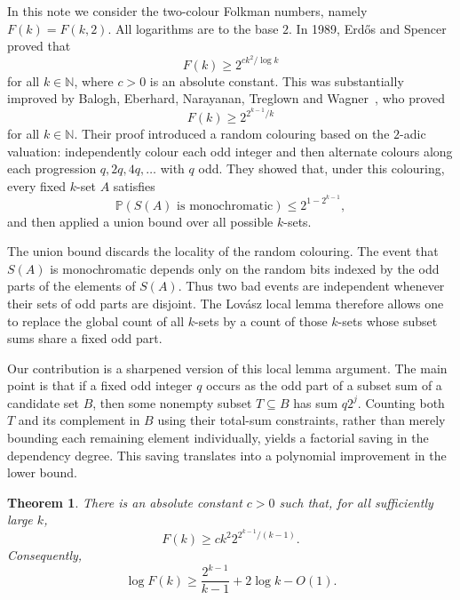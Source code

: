 \documentclass[12pt,a4paper,english,reqno]{amsart}
\theoremstyle{plain}
\newtheorem{theorem}{Theorem}[section]
\theoremstyle{remark}
\newcommand{\N}{\mathbb{N}}
\begin{document}
In this note we consider the two-colour Folkman numbers, namely $F(k)=F(k,2)$. All logarithms are to the base $2$. In 1989, Erd\H{o}s and Spencer~\cite{erdosspencer} proved that
\begin{equation}\label{es}
F(k) \ge 2^{c k^2/\log k}
\end{equation}
for all $k \in \N$, where $c>0$ is an absolute constant. This was substantially improved by Balogh, Eberhard, Narayanan, Treglown and Wagner~\cite{BENTW}, who proved
\begin{equation}\label{bentw}
F(k) \ge 2^{2^{k-1}/k}
\end{equation}
for all $k \in \N$. Their proof introduced a random colouring based on the $2$-adic valuation: independently colour each odd integer and then alternate colours along each progression $q,2q,4q,\dots$ with $q$ odd. They showed that, under this colouring, every fixed $k$-set $A$ satisfies
\[
\mathbb P(S(A)\text{ is monochromatic})\le 2^{1-2^{k-1}},
\]
and then applied a union bound over all possible $k$-sets.

The union bound discards the locality of the random colouring. The event that $S(A)$ is monochromatic depends only on the random bits indexed by the odd parts of the elements of $S(A)$. Thus two bad events are independent whenever their sets of odd parts are disjoint. The Lov\'{a}sz local lemma therefore allows one to replace the global count of all $k$-sets by a count of those $k$-sets whose subset sums share a fixed odd part.

Our contribution is a sharpened version of this local lemma argument. The main point is that if a fixed odd integer $q$ occurs as the odd part of a subset sum of a candidate set $B$, then some nonempty subset $T\subseteq B$ has sum $q2^j$. Counting both $T$ and its complement in $B$ using their total-sum constraints, rather than merely bounding each remaining element individually, yields a factorial saving in the dependency degree. This saving translates into a polynomial improvement in the lower bound.

\begin{theorem}\label{mainthm}
There is an absolute constant $c>0$ such that, for all sufficiently large $k$,
\begin{equation}\label{mainbound}
F(k) \ge c k^2 2^{2^{k-1}/(k-1)}.
\end{equation}
Consequently,
\begin{equation}\label{logmainbound}
\log F(k) \ge \frac{2^{k-1}}{k-1}+2\log k-O(1).
\end{equation}
\end{theorem}
\end{document}
